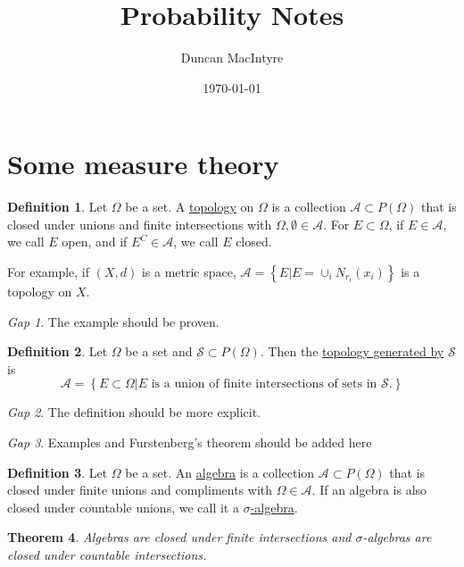 \documentclass[11pt]{article}
\newcommand{\col}[1]{\mathscr{#1}}
\newcommand{\pset}[1]{P\left(#1\right)}
\newcommand{\defname}[1]{\underline{#1}}
\theoremstyle{theorem}
\newtheorem{theorem}{Theorem}[section]
\theoremstyle{definition}
\newtheorem{definition}[theorem]{Definition}
\theoremstyle{remark}
\theoremstyle{step}
\theoremstyle{gap}
\newtheorem*{gap}{Gap}
\begin{document}
\title{Probability Notes}
\author{Duncan MacIntyre}
\date{\today}
\maketitle
\tableofcontents
\bigskip
\newpage

\section{Some measure theory}

\begin{definition}
Let \(\Omega\) be a set. A \defname{topology} on \(\Omega\) is a collection \(\col{A} \subset \pset{\Omega}\) that is closed under unions and finite intersections with \(\Omega, \emptyset \in \col{A}\). For \(E \subset \Omega\), if \(E \in \col{A}\), we call \(E\) open, and if \(E^C \in \col{A}\), we call \(E\) closed.
\end{definition}

For example, if \((X, d)\) is a metric space, \(\col{A} = \left\{E | E = \cup_i N_{r_i} \left(x_i\right)\right\}\) is a topology on \(X\).

\begin{gap} The example should be proven.\end{gap}

\begin{definition}
Let \(\Omega\) be a set and \(\col{S} \subset \pset{\Omega}\). Then the \defname{topology generated by} \(\col{S}\) is
\[\col{A} = \left\{E \subset \Omega | E \text{ is a union of finite intersections of sets in } \col{S}.\right\}\]
\end{definition}

\begin{gap} The definition should be more explicit.\end{gap}

\begin{gap} Examples and Furstenberg's theorem should be added here \end{gap}

\begin{definition}
Let \(\Omega\) be a set. An \defname{algebra} is a collection \(\col{A} \subset \pset{\Omega}\) that is closed under finite unions and compliments with \(\Omega \in \col{A}\). If an algebra is also closed under countable unions, we call it a \defname{\(\sigma\)-algebra}.
\end{definition}

\begin{theorem}
Algebras are closed under finite intersections and \(\sigma\)-algebras are closed under countable intersections.
\end{theorem}
\end{document}
